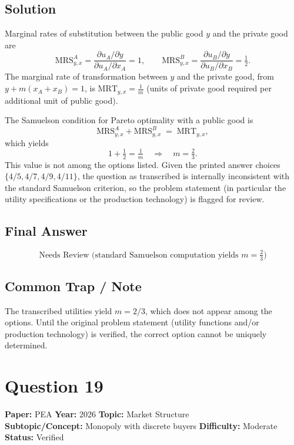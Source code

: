 \documentclass[11pt]{article}
\begin{document}
\subsection*{Solution}
Marginal rates of substitution between the public good $y$ and the private good are
\[
\text{MRS}^A_{y,x} = \frac{\partial u_A/\partial y}{\partial u_A/\partial x_A} = 1,
\qquad
\text{MRS}^B_{y,x} = \frac{\partial u_B/\partial y}{\partial u_B/\partial x_B} = \tfrac{1}{2}.
\]
The marginal rate of transformation between $y$ and the private good, from
$y + m(x_A + x_B) = 1$, is $\text{MRT}_{y,x} = \tfrac{1}{m}$ (units of private
good required per additional unit of public good).

The Samuelson condition for Pareto optimality with a public good is
\[
\text{MRS}^A_{y,x} + \text{MRS}^B_{y,x} \;=\; \text{MRT}_{y,x},
\]
which yields
\[
1 + \tfrac{1}{2} = \tfrac{1}{m} \quad\Longrightarrow\quad m = \tfrac{2}{3}.
\]
This value is not among the options listed. Given the printed answer choices
$\{4/5, 4/7, 4/9, 4/11\}$, the question as transcribed is internally inconsistent
with the standard Samuelson criterion, so the problem statement (in particular
the utility specifications or the production technology) is flagged for review.

\subsection*{Final Answer}
\[
\boxed{\text{Needs Review (standard Samuelson computation yields } m = \tfrac{2}{3})}
\]

\subsection*{Common Trap / Note}
The transcribed utilities yield $m = 2/3$, which does not appear among the
options. Until the original problem statement (utility functions and/or
production technology) is verified, the correct option cannot be uniquely
determined.

\section*{Question 19}
\textbf{Paper:} PEA \quad \textbf{Year:} 2026 \quad \textbf{Topic:} Market Structure \\
\textbf{Subtopic/Concept:} Monopoly with discrete buyers \quad
\textbf{Difficulty:} Moderate \quad \textbf{Status:} Verified
\end{document}

